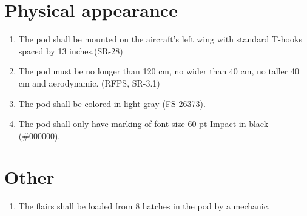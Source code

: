 \documentclass[Main]{subfiles}
\begin{document}
\section{Physical appearance}
\begin{enumerate}[label=\bfseries DDD-4.\arabic*:]

\item The pod shall be mounted on the aircraft's left wing with standard T-hooks spaced by 13 inches.(SR-28)

\item The pod must be no longer than 120 cm, no wider than 40 cm, no taller 40 cm and aerodynamic. (RFPS, SR-3.1)

\item The pod shall be colored in light gray (FS 26373).

\item The pod shall only have marking of font size 60 pt Impact in black (\#000000).

\end{enumerate}


\section{Other}

\begin{enumerate}[label=\bfseries DDD-5.\arabic*:]

\item The flairs shall be loaded from 8 hatches in the pod by a mechanic.

\end{enumerate}
\end{document}
